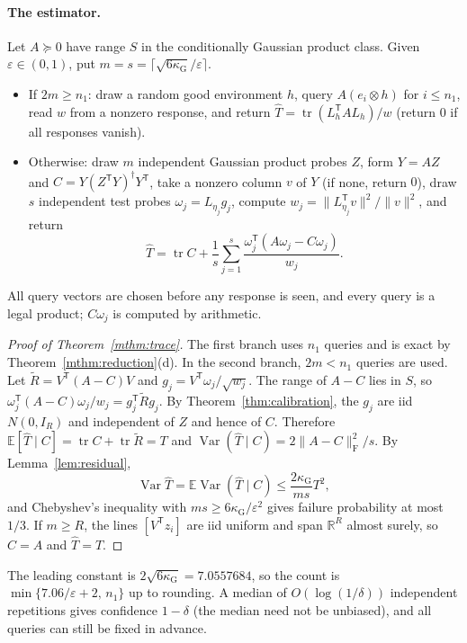 \documentclass[11pt,a4paper]{article}
\theoremstyle{definition}
\theoremstyle{remark}
\numberwithin{equation}{section}
\newcommand{\E}{\mathbb E}
\newcommand{\R}{\mathbb R}
\newcommand{\T}{{\mathsf T}}
\newcommand{\tr}{\operatorname{tr}}
\newcommand{\Var}{\operatorname{Var}}
\newcommand{\norm}[1]{\lVert#1\rVert}
\newcommand{\eps}{\varepsilon}
\newcommand{\kapG}{\kappa_{\mathrm G}}
\newcommand{\F}{\mathrm F}
\begin{document}
\paragraph{The estimator.} Let $A\succeq0$ have range $S$ in the conditionally
Gaussian product class. Given $\eps\in(0,1)$, put
$m=s=\lceil\sqrt{6\kapG}/\eps\rceil$.
\begin{itemize}
\item If $2m\ge n_1$: draw a random good environment $h$, query $A(e_i\otimes h)$
      for $i\le n_1$, read $w$ from a nonzero response, and return
      $\widehat T=\tr(L_h^\T AL_h)/w$ (return $0$ if all responses vanish).
\item Otherwise: draw $m$ independent Gaussian product probes $Z$, form $Y=AZ$
      and $C=Y(Z^\T Y)^\dagger Y^\T$, take a nonzero column $v$ of $Y$ (if none,
      return $0$), draw $s$ independent test probes $\omega_j=L_{\eta_j}g_j$,
      compute $w_j=\norm{L_{\eta_j}^\T v}^2/\norm v^2$, and return
      \begin{equation}\label{eq:traceest}
       \widehat T=\tr C+\frac1s\sum_{j=1}^s\frac{\omega_j^\T(A\omega_j-C\omega_j)}{w_j}.
      \end{equation}
\end{itemize}
All query vectors are chosen before any response is seen, and every query is a
legal product; $C\omega_j$ is computed by arithmetic.

\begin{proof}[Proof of Theorem~\ref{mthm:trace}]
The first branch uses $n_1$ queries and is exact by
Theorem~\ref{mthm:reduction}(d). In the second branch, $2m<n_1$ queries are
used. Let $\widetilde R=V^\T(A-C)V$ and $g_j=V^\T\omega_j/\sqrt{w_j}$. The range of
$A-C$ lies in $S$, so $\omega_j^\T(A-C)\omega_j/w_j=g_j^\T\widetilde Rg_j$. By
Theorem~\ref{thm:calibration}, the $g_j$ are iid $N(0,I_R)$ and independent of
$Z$ and hence of $C$. Therefore $\E[\widehat T\mid C]=\tr C+\tr\widetilde R=T$ and
$\Var(\widehat T\mid C)=2\norm{A-C}_\F^2/s$. By Lemma~\ref{lem:residual},
\[
 \Var\widehat T=\E\Var(\widehat T\mid C)\le\frac{2\kapG}{ms}T^2,
\]
and Chebyshev's inequality with $ms\ge6\kapG/\eps^2$ gives failure probability
at most $1/3$. If $m\ge R$, the lines $[V^\T z_i]$ are iid uniform and span
$\R^R$ almost surely, so $C=A$ and $\widehat T=T$.
\end{proof}

The leading constant is $2\sqrt{6\kapG}=7.0557684$, so the count is
$\min\{7.06/\eps+2,\,n_1\}$ up to rounding. A median of $O(\log(1/\delta))$
independent repetitions gives confidence $1-\delta$ (the median need not be
unbiased), and all queries can still be fixed in advance.
\end{document}

